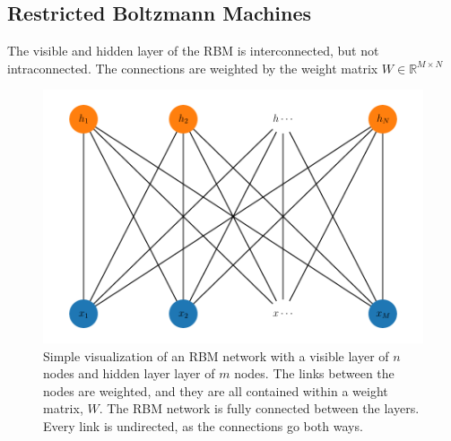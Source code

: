 \subsection{Restricted Boltzmann Machines}
The visible and hidden layer of the RBM is interconnected, but not intraconnected. The connections are weighted by the weight matrix $W\in\mathbb{R}^{M\times N}$


\begin{figure}[H]
\begin{center}\includegraphics[scale=0.5]{latex/latex-report/Images/rbm_visualize.pdf}
\end{center}
\caption{Simple visualization of an RBM network with a visible layer of $n$ nodes and hidden layer layer of $m$ nodes. The links between the nodes are weighted, and they are all contained within a weight matrix, $W$. The RBM network is fully connected between the layers. Every link is undirected, as the connections go both ways.}
\label{fig:vis_RBM}
\end{figure}




